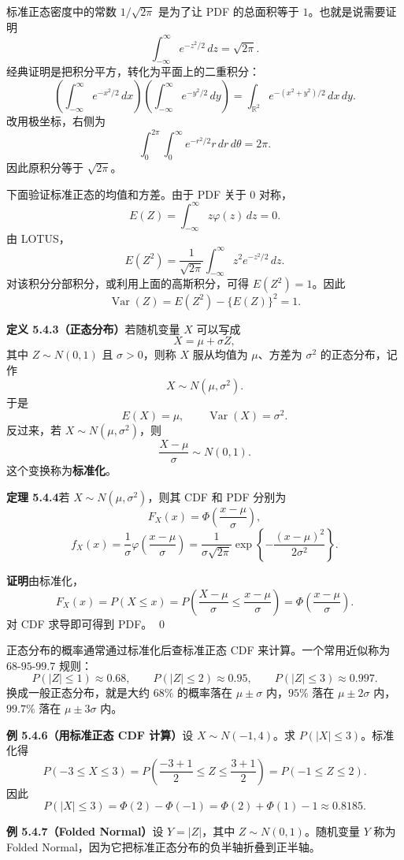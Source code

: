 \documentclass[UTF8, 12pt, fontset=fandol, oneside]{ctexart}
\begin{document}
标准正态密度中的常数 $1/\sqrt{2\pi}$ 是为了让 PDF 的总面积等于 $1$。也就是说需要证明
\[
  \int_{-\infty}^{\infty} e^{-z^2/2}\,dz=\sqrt{2\pi}.
\]
经典证明是把积分平方，转化为平面上的二重积分：
\[
  \left(\int_{-\infty}^{\infty} e^{-x^2/2}\,dx\right)
  \left(\int_{-\infty}^{\infty} e^{-y^2/2}\,dy\right)
  =
  \int_{\mathbb{R}^2}e^{-(x^2+y^2)/2}\,dx\,dy.
\]
改用极坐标，右侧为
\[
  \int_0^{2\pi}\int_0^\infty e^{-r^2/2}r\,dr\,d\theta
  =2\pi.
\]
因此原积分等于 $\sqrt{2\pi}$。

下面验证标准正态的均值和方差。由于 PDF 关于 $0$ 对称，
\[
  E(Z)=\int_{-\infty}^{\infty}z\varphi(z)\,dz=0.
\]
由 LOTUS，
\[
  E(Z^2)=\frac{1}{\sqrt{2\pi}}\int_{-\infty}^{\infty}z^2e^{-z^2/2}\,dz.
\]
对该积分分部积分，或利用上面的高斯积分，可得 $E(Z^2)=1$。因此
\[
  \operatorname{Var}(Z)=E(Z^2)-\{E(Z)\}^2=1.
\]

\noindent\textbf{定义 5.4.3（正态分布）}\quad 若随机变量 $X$ 可以写成
\[
  X=\mu+\sigma Z,
\]
其中 $Z\sim N(0,1)$ 且 $\sigma>0$，则称 $X$ 服从均值为 $\mu$、方差为 $\sigma^2$ 的正态分布，记作
\[
  X\sim N(\mu,\sigma^2).
\]
于是
\[
  E(X)=\mu,\qquad \operatorname{Var}(X)=\sigma^2.
\]
反过来，若 $X\sim N(\mu,\sigma^2)$，则
\[
  \frac{X-\mu}{\sigma}\sim N(0,1).
\]
这个变换称为\textbf{标准化}。

\noindent\textbf{定理 5.4.4}\quad 若 $X\sim N(\mu,\sigma^2)$，则其 CDF 和 PDF 分别为
\[
  F_X(x)=\Phi\left(\frac{x-\mu}{\sigma}\right),
\]
\[
  f_X(x)=\frac{1}{\sigma}\varphi\left(\frac{x-\mu}{\sigma}\right)
  =\frac{1}{\sigma\sqrt{2\pi}}
  \exp\left\{-\frac{(x-\mu)^2}{2\sigma^2}\right\}.
\]

\noindent\textbf{证明}\quad 由标准化，
\[
  F_X(x)=P(X\le x)
  =P\left(\frac{X-\mu}{\sigma}\le \frac{x-\mu}{\sigma}\right)
  =\Phi\left(\frac{x-\mu}{\sigma}\right).
\]
对 CDF 求导即可得到 PDF。
\qed

正态分布的概率通常通过标准化后查标准正态 CDF 来计算。一个常用近似称为 $68$-$95$-$99.7$ 规则：
\[
  P(|Z|\le1)\approx0.68,\qquad
  P(|Z|\le2)\approx0.95,\qquad
  P(|Z|\le3)\approx0.997.
\]
换成一般正态分布，就是大约 $68\%$ 的概率落在 $\mu\pm\sigma$ 内，$95\%$ 落在 $\mu\pm2\sigma$ 内，$99.7\%$ 落在 $\mu\pm3\sigma$ 内。

\noindent\textbf{例 5.4.6（用标准正态 CDF 计算）}\quad 设 $X\sim N(-1,4)$。求 $P(|X|\le3)$。标准化得
\[
  P(-3\le X\le3)
  =
  P\left(\frac{-3+1}{2}\le Z\le \frac{3+1}{2}\right)
  =
  P(-1\le Z\le2).
\]
因此
\[
  P(|X|\le3)=\Phi(2)-\Phi(-1)=\Phi(2)+\Phi(1)-1\approx0.8185.
\]

\noindent\textbf{例 5.4.7（Folded Normal）}\quad 设 $Y=|Z|$，其中 $Z\sim N(0,1)$。随机变量 $Y$ 称为 Folded Normal，因为它把标准正态分布的负半轴折叠到正半轴。
\end{document}

